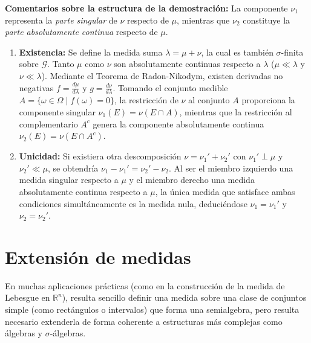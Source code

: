 \begin{demostracion}
\textbf{Comentarios sobre la estructura de la demostración:}
La componente $\nu_1$ representa la \textit{parte singular} de $\nu$ respecto de $\mu$, mientras que $\nu_2$ constituye la \textit{parte absolutamente continua} respecto de $\mu$. 

\begin{enumerate}[label=\arabic*.]
    \item \textbf{Existencia:} Se define la medida suma $\lambda = \mu + \nu$, la cual es también $\sigma$-finita sobre $\mathcal{G}$. Tanto $\mu$ como $\nu$ son absolutamente continuas respecto a $\lambda$ ($\mu \ll \lambda$ y $\nu \ll \lambda$). Mediante el Teorema de Radon-Nikodym, existen derivadas no negativas $f = \frac{d\mu}{d\lambda}$ y $g = \frac{d\nu}{d\lambda}$. Tomando el conjunto medible $A = \{\omega \in \Omega \mid f(\omega) = 0\}$, la restricción de $\nu$ al conjunto $A$ proporciona la componente singular $\nu_1(E) = \nu(E \cap A)$, mientras que la restricción al complementario $A^c$ genera la componente absolutamente continua $\nu_2(E) = \nu(E \cap A^c)$.
    
    \item \textbf{Unicidad:} Si existiera otra descomposición $\nu = \nu_1' + \nu_2'$ con $\nu_1' \perp \mu$ y $\nu_2' \ll \mu$, se obtendría $\nu_1 - \nu_1' = \nu_2' - \nu_2$. Al ser el miembro izquierdo una medida singular respecto a $\mu$ y el miembro derecho una medida absolutamente continua respecto a $\mu$, la única medida que satisface ambas condiciones simultáneamente es la medida nula, deduciéndose $\nu_1 = \nu_1'$ y $\nu_2 = \nu_2'$.
\end{enumerate}
\end{demostracion}

\newpage
\section{Extensión de medidas}

En muchas aplicaciones prácticas (como en la construcción de la medida de Lebesgue en $\mathbb{R}^n$), resulta sencillo definir una medida sobre una clase de conjuntos simple (como rectángulos o intervalos) que forma una semialgebra, pero resulta necesario extenderla de forma coherente a estructuras más complejas como álgebras y $\sigma$-álgebras.

